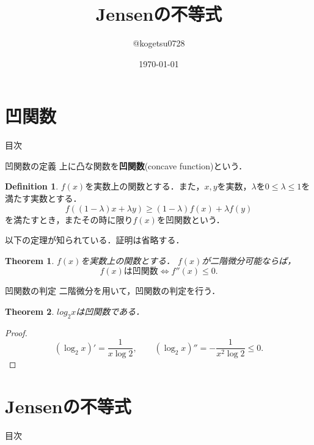 \documentclass[dvipdfmx,aspectratio=169]{beamer}
\title{
    Jensenの不等式
}
\author{@kogetsu0728}
\date{\today}
\theoremstyle{plain}
\newtheorem{thm}{Theorem}
\theoremstyle{definition}
\newtheorem{dfn}{Definition}
\begin{document}
\maketitle

\section{凹関数}
\begin{frame}{目次}
	\tableofcontents[currentsection]
\end{frame}

\begin{frame}{凹関数の定義}
    上に凸な関数を\textbf{凹関数}(concave function)という\cite{lit:proof}．
    \begin{dfn}
        $f(x)$を実数上の関数とする．また，$x,y$を実数，$\lambda$を$0 \le \lambda \le 1$を満たす実数とする．
        \[
            f((1-\lambda)x + \lambda y) \ge (1-\lambda)f(x) + \lambda f(y)
        \]
        を満たすとき，またその時に限り$f(x)$を凹関数という．
    \end{dfn}

    以下の定理が知られている．証明は省略する．
    \begin{thm}
        $f(x)$を実数上の関数とする． $f(x)$が二階微分可能ならば，
        \[
            \text{$f(x)$は凹関数} \iff f''(x) \le 0.
        \]
    \end{thm}
\end{frame}

\begin{frame}{凹関数の判定}
    二階微分を用いて，凹関数の判定を行う．

    \begin{thm}
        $log_2 x$は凹関数である．
    \end{thm}

    \begin{proof}
        \[
            (\log_2 x)' = \frac{1}{x \log 2}, \qquad
            (\log_2 x)'' = -\frac{1}{x^2 \log 2} \le 0.
        \]
    \end{proof}
\end{frame}

\section{Jensenの不等式}
\begin{frame}{目次}
	\tableofcontents[currentsection]
\end{frame}
\end{document}
